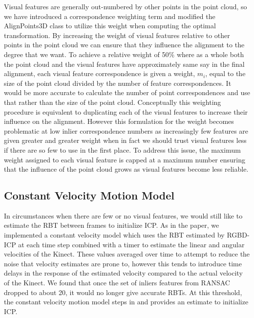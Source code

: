 \documentclass[letterpaper, 10pt, conference]{ieeeconf}
\begin{document}
	Visual features are generally out-numbered by other points in the point cloud, so we have introduced a correspondence weighting term and modified the AlignPoints3D class to utilize this weight when computing the optimal transformation.  By increasing the weight of visual features relative to other points in the point cloud we can ensure that they influence the alignment to the degree that we want.  To achieve a relative weight of 50\% where as a whole both the point cloud and the visual features have approximately same say in the final alignment, each visual feature correspondence is given a weight, $m_{i}$, equal to the size of the point cloud divided by the number of feature correspondences.  It would be more accurate to calculate the number of point correspondences and use that rather than the size of the point cloud.  Conceptually this weighting procedure is equivalent to duplicating each of the visual features to increase their influence on the alignment.  However this formulation for the weight becomes problematic at low inlier correspondence numbers as increasingly few features are given greater and greater weight when in fact we should trust visual features less if there are so few to use in the first place.  To address this issue, the maximum weight assigned to each visual feature is capped at a maximum number ensuring that the influence of the point cloud grows as visual features become less reliable.

\subsection{Constant Velocity Motion Model}
In circumstances when there are few or no visual features, we would still like to estimate the RBT between frames to initialize ICP.  As in the paper, we implemented a constant velocity model which uses the RBT estimated by RGBD-ICP at each time step combined with a timer to estimate the linear and angular velocities of the Kinect.  These values averaged over time to attempt to reduce the noise that velocity estimates are prone to, however this tends to introduce time delays in the response of the estimated velocity compared to the actual velocity of the Kinect.  We found that once the set of inliers features from RANSAC dropped to about 20, it would no longer give accurate RBTs.  At this threshold, the constant velocity motion model steps in and provides an estimate to initialize ICP.
\end{document}
